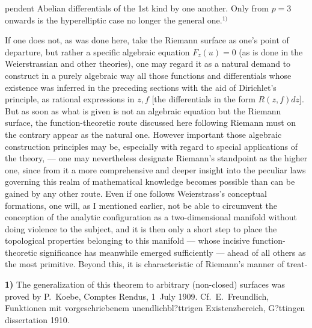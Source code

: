 \documentclass{article}
\begin{document}
pendent Abelian differentials of the 1st kind by one another. Only from $p = 3$ onwards is the hyperelliptic case no longer the general one.${}^{1)}$

If one does not, as was done here, take the Riemann surface as one's point of departure, but rather a specific algebraic equation $F_z(u) = 0$ (as is done in the Weierstrassian and other theories), one may regard it as a natural demand to construct in a purely algebraic way all those functions and differentials whose existence was inferred in the preceding sections with the aid of Dirichlet's principle, as rational expressions in $z, f$ [the differentials in the form $R(z, f)dz$]. But as soon as what is given is not an algebraic equation but the Riemann surface, the function-theoretic route discussed here following Riemann must on the contrary appear as the natural one. However important those algebraic construction principles may be, especially with regard to special applications of the theory, --- one may nevertheless designate Riemann's standpoint as the higher one, since from it a more comprehensive and deeper insight into the peculiar laws governing this realm of mathematical knowledge becomes possible than can be gained by any other route. Even if one follows Weierstrass's conceptual formations, one will, as I mentioned earlier, not be able to circumvent the conception of the analytic configuration as a two-dimensional manifold without doing violence to the subject, and it is then only a short step to place the topological properties belonging to this manifold --- whose incisive function-theoretic significance has meanwhile emerged sufficiently --- ahead of all others as the most primitive. Beyond this, it is characteristic of Riemann's manner of treat-

\textbf{1)} The generalization of this theorem to arbitrary (non-closed) surfaces was proved by P.~Koebe, Comptes Rendus, 1~July 1909. Cf.\ E.~Freundlich, Funktionen mit vorgeschriebenem unendlichbl?ttrigen Existenzbereich, G?ttingen dissertation 1910.
\end{document}
